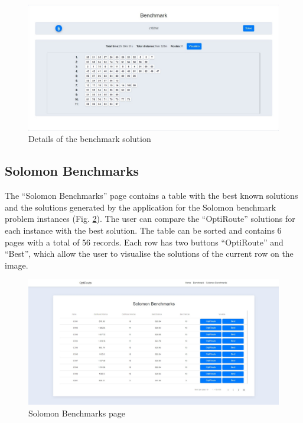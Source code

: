 \documentclass[a4paper,twoside,12pt]{book}
\begin{document}
\begin{figure}[htbp]
\centering
\includegraphics[width=\textwidth]{images/benchmarkSolved_updated.jpg}
\caption{Details of the benchmark solution}
\label{fig:benchmarkSolved}
\end{figure}

\subsection{Solomon Benchmarks}

The ``Solomon Benchmarks'' page contains a table with the best known solutions and the solutions generated by the application for the Solomon benchmark problem instances (Fig. \ref{fig:solomonBenchmark}). The user can compare the ``OptiRoute'' solutions for each instance with the best solution. The table can be sorted and contains 6 pages with a total of 56 records. Each row has two buttons ``OptiRoute'' and ``Best'', which allow the user to visualise the solutions of the current row on the image.

\begin{figure}[htb]
\centering
\includegraphics[width=\textwidth]{images/solomonBenchmark.jpg}
\caption{Solomon Benchmarks page}
\label{fig:solomonBenchmark}
\end{figure}
\end{document}
